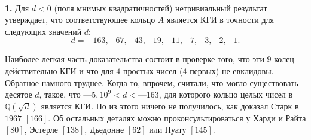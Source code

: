 \documentclass{mai_book}
\begin{document}

\begin{mynotice}
\\
\textbf{1.} Для $d < 0$ (поля мнимых квадратичностей) нетривиальный 
результат утверждает, что соответствующее кольцо $A$ является КГИ в
точности для следующих значений $d$:
\[
d = -163, -67, -43, -19, -11, -7, -3, -2, -1.
\]

\noindent Наиболее легкая часть доказательства состоит в проверке того, что эти
$9$ колец — действительно КГИ и что для $4$ простых чисел ($4$ первых)
не евклидовы. Обратное намного труднее. Когда-то, впрочем, 
считали, что могло существовать десятое $d$, такое, что $—5,10^9 < d < —163$,
для которого кольцо целых чисел в $\mathbb{Q}(\sqrt{d})$ является КГИ. Но из этого ничего не получилось, как доказал Старк в $1967$ $[166]$. Об остальных 
деталях можно проконсультироваться у Харди и Райта $[80]$, Эстерле $[138]$,
Дьедонне $[62]$ или Пуату $[145]$.
\end{mynotice}

\pagebreak
\end{document}
